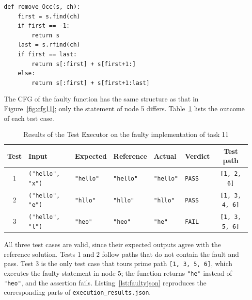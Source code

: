\documentclass[11pt, a4paper]{article}
\begin{document}
\begin{lstlisting}[style=python, caption={Faulty implementation of task 11 (line 9 omits \texttt{+ s[last+1:]})}, label={lst:faulty}]
def remove_Occ(s, ch):
    first = s.find(ch)
    if first == -1:
        return s
    last = s.rfind(ch)
    if first == last:
        return s[:first] + s[first+1:]
    else:
        return s[:first] + s[first+1:last]
\end{lstlisting}

The CFG of the faulty function has the same structure as that in Figure~\ref{fig:cfg11}; only the statement of node 5 differs. Table~\ref{tab:faulty} lists the outcome of each test case.

\begin{table}[H]
    \centering
    \small
    \begin{tabular}{clllllc}
        \toprule
        \textbf{Test} & \textbf{Input} & \textbf{Expected} & \textbf{Reference} & \textbf{Actual} & \textbf{Verdict} & \textbf{Test path} \\
        \midrule
        1 & \texttt{("hello", "x")} & \texttt{"hello"} & \texttt{"hello"} & \texttt{"hello"} & \texttt{PASS} & \texttt{[1, 2, 6]} \\
        2 & \texttt{("hello", "e")} & \texttt{"hllo"} & \texttt{"hllo"} & \texttt{"hllo"} & \texttt{PASS} & \texttt{[1, 3, 4, 6]} \\
        3 & \texttt{("hello", "l")} & \texttt{"heo"} & \texttt{"heo"} & \texttt{"he"} & \texttt{FAIL} & \texttt{[1, 3, 5, 6]} \\
        \bottomrule
    \end{tabular}
    \caption{Results of the Test Executor on the faulty implementation of task 11}
    \label{tab:faulty}
\end{table}

All three test cases are valid, since their expected outputs agree with the reference solution. Tests 1 and 2 follow paths that do not contain the fault and pass. Test 3 is the only test case that tours prime path \texttt{[1, 3, 5, 6]}, which executes the faulty statement in node 5; the function returns \texttt{"he"} instead of \texttt{"heo"}, and the assertion fails. Listing~\ref{lst:faultyjson} reproduces the corresponding parts of \texttt{execution\_results.json}.
\end{document}
